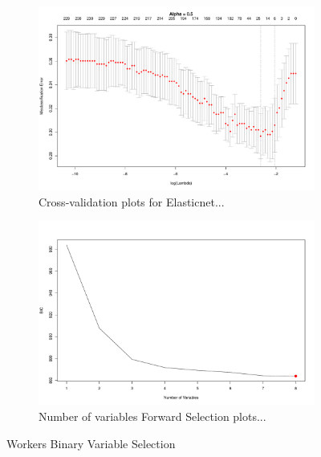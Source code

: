 \documentclass{article}
\begin{document}
\begin{figure}[!tbp]
\begin{subfigure}[b]{0.5\textwidth}
\includegraphics[width=\textwidth]{elastic_cv_workers_binary.pdf}
\caption{Cross-validation plots for Elasticnet...}
\end{subfigure}
\hfill
\begin{subfigure}[b]{0.5\textwidth}
\includegraphics[width=\textwidth]{forward_nvars_workers_binary.pdf}
\caption{Number of variables Forward Selection plots...}
\end{subfigure}
\caption{Workers Binary Variable Selection}
\label{figure:workers_binary_opt}
\end{figure}
\end{document}
